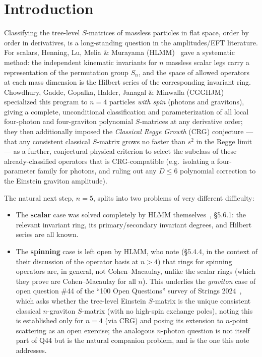 \documentclass[reqno]{amsart}
\begin{document}
\maketitle
\tableofcontents

\section{Introduction}

Classifying the tree-level $S$-matrices of massless particles in flat space, order by order in
derivatives, is a long-standing question in the amplitudes/EFT literature. For scalars, Henning,
Lu, Melia \& Murayama (HLMM)~\cite{hlmm2017} gave a systematic method: the independent kinematic
invariants for $n$ massless scalar legs carry a representation of the permutation group $S_n$, and
the space of allowed operators at each mass dimension is the Hilbert series of the corresponding
invariant ring. Chowdhury, Gadde, Gopalka, Halder, Janagal \& Minwalla
(CGGHJM)~\cite{cgghjm2019} specialized this program to $n=4$ particles \emph{with spin} (photons
and gravitons), giving a complete, unconditional classification and parameterization of all local
four-photon and four-graviton polynomial $S$-matrices at any derivative order; they then
additionally imposed the \emph{Classical Regge Growth} (CRG) conjecture --- that any consistent
classical $S$-matrix grows no faster than $s^2$ in the Regge limit --- as a further, conjectural
physical criterion to select the subclass of these already-classified operators that is
CRG-compatible (e.g.\ isolating a four-parameter family for photons, and ruling out any $D\leq6$
polynomial correction to the Einstein graviton amplitude).

The natural next step, $n=5$, splits into two problems of very different difficulty:
\begin{itemize}
    \item The \textbf{scalar} case was solved completely by HLMM themselves~\cite{hlmm2017},
    \S 5.6.1: the relevant invariant ring, its primary/secondary invariant degrees, and Hilbert
    series are all known.
    \item The \textbf{spinning} case is left open by HLMM, who note (\S 5.4.4, in the context of
    their discussion of the operator basis at $n>4$) that rings for spinning operators are, in
    general, not Cohen--Macaulay, unlike the scalar rings (which they prove are Cohen--Macaulay for
    all $n$). This underlies the \emph{graviton} case of open question \#44 of the ``100 Open
    Questions'' survey of Strings 2024~\cite{strings2024}, which asks whether the tree-level
    Einstein $S$-matrix is the unique consistent classical $n$-graviton $S$-matrix (with no
    high-spin exchange poles), noting this is established only for $n=4$ (via CRG) and posing its
    extension to $n$-point scattering as an open exercise; the analogous $n$-photon question is not
    itself part of Q44 but is the natural companion problem, and is the one this note addresses.
\end{itemize}
\end{document}
